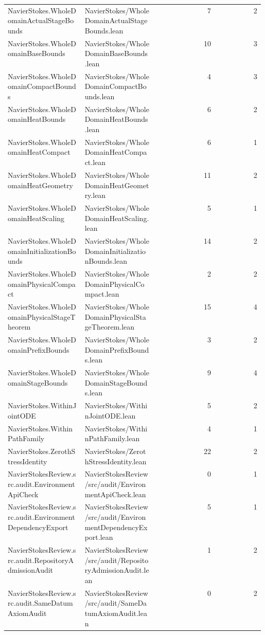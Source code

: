 \begin{longtable}{p{0.30\linewidth}p{0.28\linewidth}rr}
NavierStokes.WholeDomainActualStageBounds & NavierStokes/WholeDomainActualStageBounds.lean & 7 & 2\\
NavierStokes.WholeDomainBaseBounds & NavierStokes/WholeDomainBaseBounds.lean & 10 & 3\\
NavierStokes.WholeDomainCompactBounds & NavierStokes/WholeDomainCompactBounds.lean & 4 & 3\\
NavierStokes.WholeDomainHeatBounds & NavierStokes/WholeDomainHeatBounds.lean & 6 & 2\\
NavierStokes.WholeDomainHeatCompact & NavierStokes/WholeDomainHeatCompact.lean & 6 & 1\\
NavierStokes.WholeDomainHeatGeometry & NavierStokes/WholeDomainHeatGeometry.lean & 11 & 2\\
NavierStokes.WholeDomainHeatScaling & NavierStokes/WholeDomainHeatScaling.lean & 5 & 1\\
NavierStokes.WholeDomainInitializationBounds & NavierStokes/WholeDomainInitializationBounds.lean & 14 & 2\\
NavierStokes.WholeDomainPhysicalCompact & NavierStokes/WholeDomainPhysicalCompact.lean & 2 & 2\\
NavierStokes.WholeDomainPhysicalStageTheorem & NavierStokes/WholeDomainPhysicalStageTheorem.lean & 15 & 4\\
NavierStokes.WholeDomainPrefixBounds & NavierStokes/WholeDomainPrefixBounds.lean & 3 & 2\\
NavierStokes.WholeDomainStageBounds & NavierStokes/WholeDomainStageBounds.lean & 9 & 4\\
NavierStokes.WithinJointODE & NavierStokes/WithinJointODE.lean & 5 & 2\\
NavierStokes.WithinPathFamily & NavierStokes/WithinPathFamily.lean & 4 & 1\\
NavierStokes.ZerothStressIdentity & NavierStokes/ZerothStressIdentity.lean & 22 & 2\\
NavierStokesReview.src.audit.EnvironmentApiCheck & NavierStokesReview/src/audit/EnvironmentApiCheck.lean & 0 & 1\\
NavierStokesReview.src.audit.EnvironmentDependencyExport & NavierStokesReview/src/audit/EnvironmentDependencyExport.lean & 5 & 1\\
NavierStokesReview.src.audit.RepositoryAdmissionAudit & NavierStokesReview/src/audit/RepositoryAdmissionAudit.lean & 1 & 2\\
NavierStokesReview.src.audit.SameDatumAxiomAudit & NavierStokesReview/src/audit/SameDatumAxiomAudit.lean & 0 & 2\\

\end{longtable}
